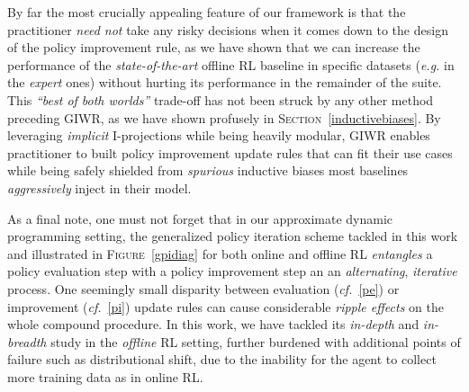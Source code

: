 By far the most crucially appealing feature of our framework is that the practitioner \emph{need not} take any
risky decisions when it comes down to the design of the policy improvement rule, as we have shown that we can
increase the performance of the \textit{state-of-the-art} offline RL baseline in specific datasets
(\textit{e.g.} in the \textit{expert} ones)
without hurting its performance in the remainder of the suite.
This \emph{``best of both worlds''} trade-off has not been struck by any other method preceding GIWR,
as we have shown profusely in \textsc{Section}~\ref{inductivebiases}.
By leveraging \emph{implicit} I-projections
while being heavily modular, GIWR enables practitioner to
built policy improvement update rules that can fit their use cases while being safely shielded from
\emph{spurious} inductive biases most baselines \emph{aggressively} inject in their model.

As a final note, one must not forget that in our approximate dynamic programming setting,
the generalized policy iteration scheme tackled in this work and illustrated in
\textsc{Figure}~\ref{gpidiag} for both online and offline RL
\emph{entangles} a policy evaluation step with a policy improvement step an an \emph{alternating},
\emph{iterative} process.
One seemingly small disparity between evaluation (\textit{cf.}~\ref{pe})
or improvement (\textit{cf.}~\ref{pi})
update rules can cause considerable \emph{ripple effects} on the whole compound procedure.
In this work, we have tackled its \textit{in-depth} and \textit{in-breadth} study in the \emph{offline} RL setting,
further burdened with additional points of failure such as distributional shift, due to the inability for the
agent to collect more training data as in online RL.

